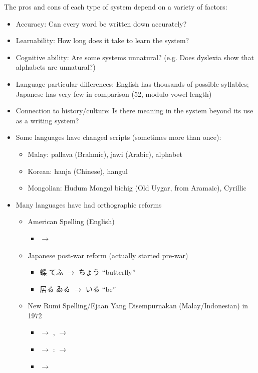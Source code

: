 \documentclass[a4paper,landscape,headrule,footrule,xetex]{foils}
\begin{document}



The pros and cons of each type of system depend on a variety of factors: 
\begin{itemize}
\item Accuracy:  Can every word be written down accurately?
\item Learnability: How long does it take to learn the system?
\item Cognitive ability: Are some systems unnatural? (e.g. Does dyslexia show that alphabets are unnatural?)
\item Language-particular differences: English has thousands of
  possible syllables; Japanese has very few in comparison (52, modulo
  vowel length)
\item Connection to history/culture: Is there meaning in the system
  beyond its use as a writing system?
  \newpage
\item Some languages have changed scripts (sometimes more than once):
  \begin{itemize}
  \item  Malay: pallava (Brahmic),  jawi (Arabic), alphabet
  \item  Korean: hanja (Chinese), hangul
  \item Mongolian: Hudum Mongol bichig (Old Uygar, from Aramaic), Cyrillic
  \end{itemize}
\item Many languages have had orthographic reforms
  \begin{itemize}
  \item American Spelling (English)
    \begin{itemize}
    \item {} $\rightarrow$ 
    \end{itemize}
  \item Japanese post-war reform (actually started pre-war)
    \begin{itemize}
    \item  蝶   てふ  $\rightarrow$  ちょう
       ``butterfly''
    \item  居る ゐる  $\rightarrow$  いる  ``be''
  \end{itemize}

\item New Rumi Spelling/Ejaan Yang Disempurnakan (Malay/Indonesian) in 1972
  \begin{itemize}
  \item {} $\rightarrow$ 	,  $\rightarrow$ 
  \item {}  $\rightarrow$ :   $\rightarrow$
  \item   {}	 $\rightarrow$ 
  \end{itemize}
\end{itemize}
\end{itemize}
\end{document}
